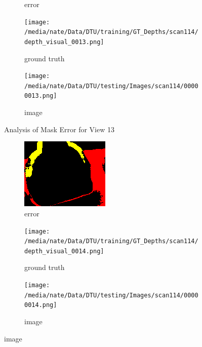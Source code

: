 \documentclass{article}
\begin{document}
\begin{figure}
\begin{subfigure}{0.3\textwidth}
		\caption{error}
		\label{fig:error13}
	\end{subfigure}
	\hfill
	\centering
	\begin{subfigure}{0.3\textwidth}
		\centering
		\texttt{[image: /media/nate/Data/DTU/training/GT\_Depths/scan114/depth\_visual\_0013.png]}
		\caption{ground truth}
		\label{fig:gt13}
	\end{subfigure}
	\hfill
	\centering
	\begin{subfigure}{0.3\textwidth}
		\centering
		\texttt{[image: /media/nate/Data/DTU/testing/Images/scan114/00000013.png]}
		\caption{image}
		\label{fig:img13}
	\end{subfigure}
	\hfill
	\caption{Analysis of Mask Error for View 13}
	\label{fig:error_analys13}
\end{figure}\begin{figure}
	\centering
	\begin{subfigure}{0.3\textwidth}
		\centering
		\includegraphics[width=\textwidth]{./output/014_error.png}
		\caption{error}
		\label{fig:error14}
	\end{subfigure}
	\hfill
	\centering
	\begin{subfigure}{0.3\textwidth}
		\centering
		\texttt{[image: /media/nate/Data/DTU/training/GT\_Depths/scan114/depth\_visual\_0014.png]}
		\caption{ground truth}
		\label{fig:gt14}
	\end{subfigure}
	\hfill
	\centering
	\begin{subfigure}{0.3\textwidth}
		\centering
		\texttt{[image: /media/nate/Data/DTU/testing/Images/scan114/00000014.png]}
		\caption{image}

\end{subfigure}
\end{figure}
\end{document}
